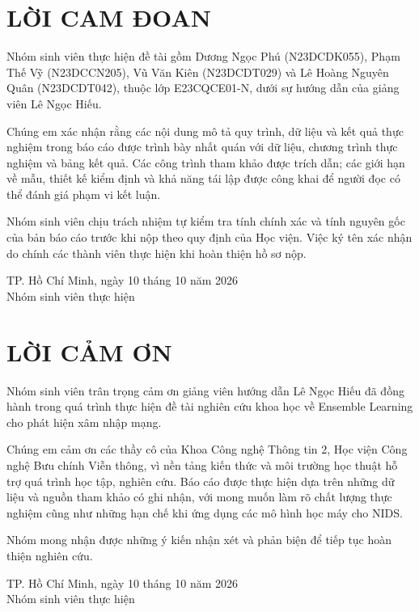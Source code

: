 \chapter*{LỜI CAM ĐOAN}
Nhóm sinh viên thực hiện đề tài gồm Dương Ngọc Phú (N23DCDK055), Phạm Thế Vỹ (N23DCCN205), Vũ Văn Kiên (N23DCDT029) và Lê Hoàng Nguyên Quân (N23DCDT042), thuộc lớp E23CQCE01-N, dưới sự hướng dẫn của giảng viên Lê Ngọc Hiếu.

Chúng em xác nhận rằng các nội dung mô tả quy trình, dữ liệu và kết quả thực nghiệm trong báo cáo được trình bày nhất quán với dữ liệu, chương trình thực nghiệm và bảng kết quả. Các công trình tham khảo được trích dẫn; các giới hạn về mẫu, thiết kế kiểm định và khả năng tái lập được công khai để người đọc có thể đánh giá phạm vi kết luận.

Nhóm sinh viên chịu trách nhiệm tự kiểm tra tính chính xác và tính nguyên gốc của bản báo cáo trước khi nộp theo quy định của Học viện. Việc ký tên xác nhận do chính các thành viên thực hiện khi hoàn thiện hồ sơ nộp.

\vspace{1.8cm}
\begin{flushright}
TP. Hồ Chí Minh, ngày 10 tháng 10 năm 2026\\[10pt]
Nhóm sinh viên thực hiện
\end{flushright}

\clearpage
\chapter*{LỜI CẢM ƠN}
Nhóm sinh viên trân trọng cảm ơn giảng viên hướng dẫn Lê Ngọc Hiếu đã đồng hành trong quá trình thực hiện đề tài nghiên cứu khoa học về Ensemble Learning cho phát hiện xâm nhập mạng.

Chúng em cảm ơn các thầy cô của Khoa Công nghệ Thông tin 2, Học viện Công nghệ Bưu chính Viễn thông, vì nền tảng kiến thức và môi trường học thuật hỗ trợ quá trình học tập, nghiên cứu. Báo cáo được thực hiện dựa trên những dữ liệu và nguồn tham khảo có ghi nhận, với mong muốn làm rõ chất lượng thực nghiệm cũng như những hạn chế khi ứng dụng các mô hình học máy cho NIDS.

Nhóm mong nhận được những ý kiến nhận xét và phản biện để tiếp tục hoàn thiện nghiên cứu.

\vspace{1.8cm}
\begin{flushright}
TP. Hồ Chí Minh, ngày 10 tháng 10 năm 2026\\[10pt]
Nhóm sinh viên thực hiện
\end{flushright}
